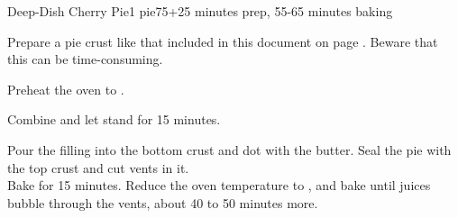 \documentclass[../Cookbook.tex]{subfiles}
\begin{document}
\begin{recipe}{Deep-Dish Cherry Pie}{1 pie}{75+25 minutes prep, 55-65 minutes baking}

	Prepare a pie crust like that included in this document on page \pageref{PieCrust}. Beware that this can be time-consuming.

	\newstep
	Preheat the oven to .

	Combine and let stand for 15 minutes.

	Pour the filling into the bottom crust and dot with the butter. Seal the pie with the top crust and cut vents in it.\\
	Bake for 15 minutes.
	Reduce the oven temperature to , and bake until juices bubble through the vents, about 40 to 50 minutes more.

\end{recipe}
\end{document}
